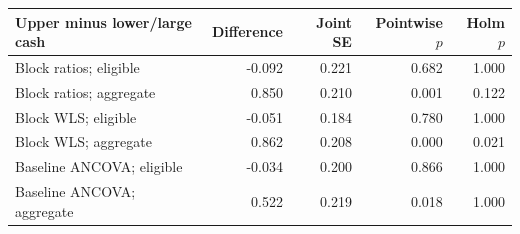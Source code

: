 \begin{tabular}{lrrrr}
\toprule
Upper minus lower/large cash & Difference & Joint SE & Pointwise $p$ & Holm $p$\\
\midrule
Block ratios; eligible & -0.092 & 0.221 & 0.682 & 1.000\\
Block ratios; aggregate & 0.850 & 0.210 & 0.001 & 0.122\\
Block WLS; eligible & -0.051 & 0.184 & 0.780 & 1.000\\
Block WLS; aggregate & 0.862 & 0.208 & 0.000 & 0.021\\
Baseline ANCOVA; eligible & -0.034 & 0.200 & 0.866 & 1.000\\
Baseline ANCOVA; aggregate & 0.522 & 0.219 & 0.018 & 1.000\\
\bottomrule
\end{tabular}
